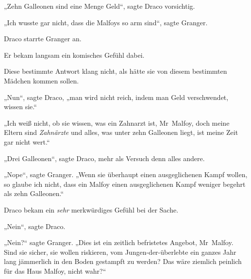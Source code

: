 „Zehn Galleonen sind eine Menge Geld“, sagte Draco vorsichtig.

„Ich wusste gar nicht, dass die Malfoys so arm sind“, sagte Granger.

Draco starrte Granger an.

Er bekam langsam ein komisches Gefühl dabei.

Diese bestimmte Antwort klang nicht, als hätte sie von diesem bestimmten Mädchen kommen sollen.

„Nun“, sagte Draco, „man wird nicht reich, indem man Geld verschwendet, wissen sie.“

„Ich weiß nicht, ob sie wissen, was ein Zahnarzt ist, Mr~Malfoy, doch meine Eltern sind \emph{Zahnärzte} und alles, was unter zehn Galleonen liegt, ist meine Zeit gar nicht wert.“

„Drei Galleonen“, sagte Draco, mehr als Versuch denn alles andere.

„Nope“, sagte Granger.
„Wenn sie überhaupt einen ausgeglichenen Kampf wollen, so glaube ich nicht, dass ein Malfoy einen ausgeglichenen Kampf weniger begehrt als zehn Galleonen.“

Draco bekam ein \emph{sehr} merkwürdiges Gefühl bei der Sache.

„Nein“, sagte Draco.

„Nein?“ sagte Granger.
„Dies ist ein zeitlich befristetes Angebot, Mr~Malfoy. Sind sie sicher, sie wollen riskieren, vom Jungen-der-überlebte ein ganzes Jahr lang jämmerlich in den Boden gestampft zu werden? Das wäre ziemlich peinlich für das Haus Malfoy, nicht wahr?“

